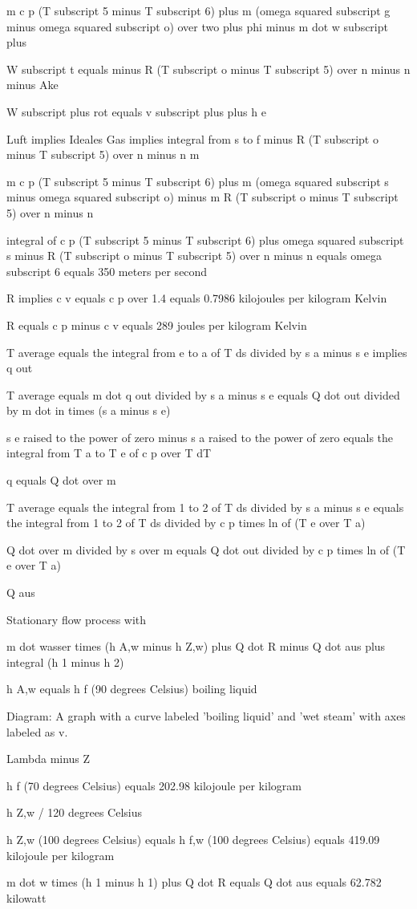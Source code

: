 m c p (T subscript 5 minus T subscript 6) plus m (omega squared subscript g minus omega squared subscript o) over two plus phi minus m dot w subscript plus

W subscript t equals minus R (T subscript o minus T subscript 5) over n minus n minus Ake

W subscript plus rot equals v subscript plus plus h e

Luft implies Ideales Gas implies integral from s to f minus R (T subscript o minus T subscript 5) over n minus n m

m c p (T subscript 5 minus T subscript 6) plus m (omega squared subscript s minus omega squared subscript o) minus m R (T subscript o minus T subscript 5) over n minus n

integral of c p (T subscript 5 minus T subscript 6) plus omega squared subscript s minus R (T subscript o minus T subscript 5) over n minus n equals omega subscript 6 equals 350 meters per second

R implies c v equals c p over 1.4 equals 0.7986 kilojoules per kilogram Kelvin

R equals c p minus c v equals 289 joules per kilogram Kelvin

T average equals the integral from e to a of T ds divided by s a minus s e implies q out

T average equals m dot q out divided by s a minus s e equals Q dot out divided by m dot in times (s a minus s e)

s e raised to the power of zero minus s a raised to the power of zero equals the integral from T a to T e of c p over T dT

q equals Q dot over m

T average equals the integral from 1 to 2 of T ds divided by s a minus s e equals the integral from 1 to 2 of T ds divided by c p times ln of (T e over T a)

Q dot over m divided by s over m equals Q dot out divided by c p times ln of (T e over T a)

Q aus

Stationary flow process with

m dot wasser times (h A,w minus h Z,w) plus Q dot R minus Q dot aus plus integral (h 1 minus h 2)

h A,w equals h f (90 degrees Celsius) boiling liquid

Diagram: A graph with a curve labeled 'boiling liquid' and 'wet steam' with axes labeled as v.

Lambda minus Z

h f (70 degrees Celsius) equals 202.98 kilojoule per kilogram

h Z,w / 120 degrees Celsius

h Z,w (100 degrees Celsius) equals h f,w (100 degrees Celsius) equals 419.09 kilojoule per kilogram

m dot w times (h 1 minus h 1) plus Q dot R equals Q dot aus equals 62.782 kilowatt